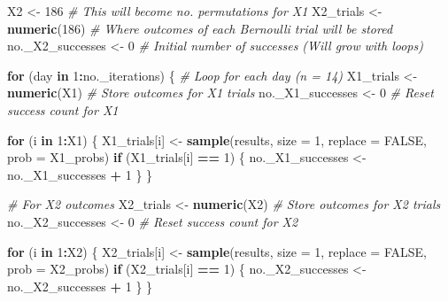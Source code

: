 \documentclass[
]{article}
\newenvironment{Shaded}{\begin{snugshade}}{\end{snugshade}}
\newcommand{\AttributeTok}[1]{\textcolor[rgb]{0.13,0.29,0.53}{#1}}
\newcommand{\CommentTok}[1]{\textcolor[rgb]{0.56,0.35,0.01}{\textit{#1}}}
\newcommand{\ConstantTok}[1]{\textcolor[rgb]{0.56,0.35,0.01}{#1}}
\newcommand{\ControlFlowTok}[1]{\textcolor[rgb]{0.13,0.29,0.53}{\textbf{#1}}}
\newcommand{\DecValTok}[1]{\textcolor[rgb]{0.00,0.00,0.81}{#1}}
\newcommand{\FunctionTok}[1]{\textcolor[rgb]{0.13,0.29,0.53}{\textbf{#1}}}
\newcommand{\NormalTok}[1]{#1}
\newcommand{\OtherTok}[1]{\textcolor[rgb]{0.56,0.35,0.01}{#1}}
\newcommand{\SpecialCharTok}[1]{\textcolor[rgb]{0.81,0.36,0.00}{\textbf{#1}}}
\begin{document}
\begin{Shaded}
\begin{Highlighting}[]
\NormalTok{X2 }\OtherTok{\textless{}{-}} \DecValTok{186}  \CommentTok{\# This will become no. permutations for X1}
\NormalTok{X2\_trials }\OtherTok{\textless{}{-}} \FunctionTok{numeric}\NormalTok{(}\DecValTok{186}\NormalTok{)  }\CommentTok{\# Where outcomes of each Bernoulli trial will be stored}
\NormalTok{no.\_X2\_successes }\OtherTok{\textless{}{-}} \DecValTok{0}  \CommentTok{\# Initial number of successes (Will grow with loops)}



\ControlFlowTok{for}\NormalTok{ (day }\ControlFlowTok{in} \DecValTok{1}\SpecialCharTok{:}\NormalTok{no.\_iterations) \{ }\CommentTok{\# Loop for each day (n = 14)}
\NormalTok{  X1\_trials }\OtherTok{\textless{}{-}} \FunctionTok{numeric}\NormalTok{(X1)  }\CommentTok{\# Store outcomes for X1 trials}
\NormalTok{  no.\_X1\_successes }\OtherTok{\textless{}{-}} \DecValTok{0}  \CommentTok{\# Reset success count for X1}
  
  \ControlFlowTok{for}\NormalTok{ (i }\ControlFlowTok{in} \DecValTok{1}\SpecialCharTok{:}\NormalTok{X1) \{}
\NormalTok{    X1\_trials[i] }\OtherTok{\textless{}{-}} \FunctionTok{sample}\NormalTok{(results, }\AttributeTok{size =} \DecValTok{1}\NormalTok{, }\AttributeTok{replace =} \ConstantTok{FALSE}\NormalTok{, }\AttributeTok{prob =}\NormalTok{ X1\_probs)}
    \ControlFlowTok{if}\NormalTok{ (X1\_trials[i] }\SpecialCharTok{==} \DecValTok{1}\NormalTok{) \{}
\NormalTok{      no.\_X1\_successes }\OtherTok{\textless{}{-}}\NormalTok{ no.\_X1\_successes }\SpecialCharTok{+} \DecValTok{1}
\NormalTok{    \}}
\NormalTok{  \}}
  
  \CommentTok{\# For X2 outcomes}
\NormalTok{  X2\_trials }\OtherTok{\textless{}{-}} \FunctionTok{numeric}\NormalTok{(X2)  }\CommentTok{\# Store outcomes for X2 trials}
\NormalTok{  no.\_X2\_successes }\OtherTok{\textless{}{-}} \DecValTok{0}  \CommentTok{\# Reset success count for X2}
  
  \ControlFlowTok{for}\NormalTok{ (i }\ControlFlowTok{in} \DecValTok{1}\SpecialCharTok{:}\NormalTok{X2) \{}
\NormalTok{    X2\_trials[i] }\OtherTok{\textless{}{-}} \FunctionTok{sample}\NormalTok{(results, }\AttributeTok{size =} \DecValTok{1}\NormalTok{, }\AttributeTok{replace =} \ConstantTok{FALSE}\NormalTok{, }\AttributeTok{prob =}\NormalTok{ X2\_probs)}
    \ControlFlowTok{if}\NormalTok{ (X2\_trials[i] }\SpecialCharTok{==} \DecValTok{1}\NormalTok{) \{}
\NormalTok{      no.\_X2\_successes }\OtherTok{\textless{}{-}}\NormalTok{ no.\_X2\_successes }\SpecialCharTok{+} \DecValTok{1}
\NormalTok{    \}}
\NormalTok{  \}}
  

\end{Highlighting}
\end{Shaded}
\end{document}
